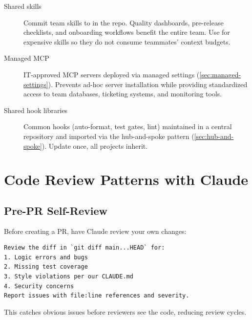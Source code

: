 \begin{description}
  \item[Shared skills] Commit team skills to  in the repo.
    Quality dashboards, pre-release checklists, and onboarding workflows
    benefit the entire team. Use  for expensive skills
    so they do not consume teammates' context budgets.
  \item[Managed MCP] IT-approved MCP servers deployed via managed settings
    (\cref{sec:managed-settings}). Prevents ad-hoc server installation
    while providing standardized access to team databases, ticketing systems,
    and monitoring tools.
  \item[Shared hook libraries] Common hooks (auto-format, test gates, lint)
    maintained in a central repository and imported via the hub-and-spoke
    pattern (\cref{sec:hub-and-spoke}). Update once, all projects inherit.
\end{description}


\section{Code Review Patterns with Claude}
\label{sec:code-review}


\subsection{Pre-PR Self-Review}

Before creating a PR, have Claude review your own changes:

\begin{verbatim}
Review the diff in `git diff main...HEAD` for:
1. Logic errors and bugs
2. Missing test coverage
3. Style violations per our CLAUDE.md
4. Security concerns
Report issues with file:line references and severity.
\end{verbatim}

This catches obvious issues before reviewers see the code,
reducing review cycles.

